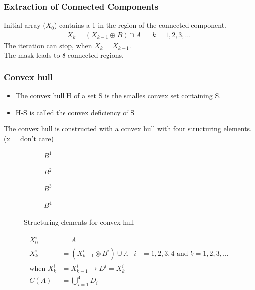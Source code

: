 \subsubsection{Extraction of Connected Components}
\begin{multicols}{2}
Initial array ($X_0$) contains a 1 in the region of the connected component.
\begin{align*}
X_k=(X_{k-1}\oplus B)\cap A && k=1,2,3,\ldots
\end{align*}
The iteration can stop, when $X_k = X_{k-1}$. \\
The mask \quad {}
\quad leads to 8-connected regions.
\end{multicols}

\subsubsection{Convex hull}
\begin{itemize}
\item The convex hull H of a set S is the smalles convex set containing S.
\item H-S is called the convex deficiency of S
\end{itemize}
The convex hull is constructed with a convex hull with four structuring elements. (x = don't care)
\begin{figure}[h]
	\centering
	\begin{subfigure}[b]{0.2\textwidth}
		\centering
		\caption{$B^1$}
	\end{subfigure}
	\begin{subfigure}[b]{0.2\textwidth}
		\centering
		\caption{$B^2$}
	\end{subfigure}
	\begin{subfigure}[b]{0.2\textwidth}
		\centering
		\caption{$B^3$}
	\end{subfigure}
	\begin{subfigure}[b]{0.2\textwidth}
		\centering
		\caption{$B^4$}
	\end{subfigure}
	\caption{Structuring elements for convex hull}
\end{figure}

\begin{align*}
	X_0^i &= A \\
	X_k^i &= (X_{k-1}^i \circledast B^i) \cup A & i &=1,2,3,4 \text{ and } k=1,2,3,\ldots \\
	\text{when } X_k^i &= X_{k-1}^i \longrightarrow D^i = X_k^i \\
	C(A) &= \bigcup\limits_{i=1}^4 D_i
\end{align*}


